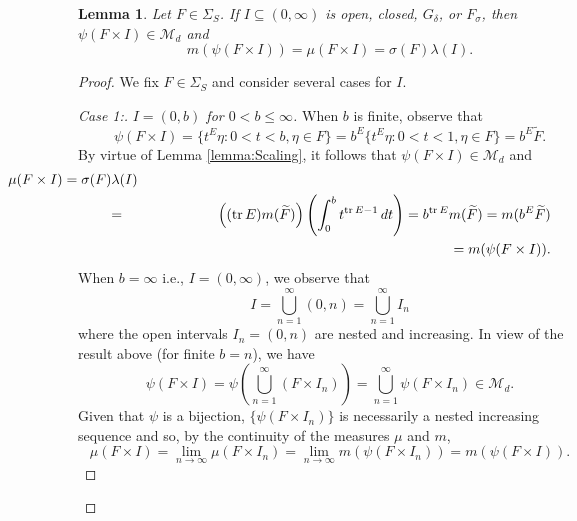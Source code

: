 \documentclass[11pt]{article}
\theoremstyle{theorem}
\newtheorem{lemma}[theorem]{Lemma}
\newcommand*{\myproofname}{Proof}
\newenvironment{subproof}[1][\myproofname]{\begin{proof}[#1]\renewcommand*{\qedsymbol}{$\mathbin{/\mkern-6mu/}$}}{\end{proof}}
\newcommand\tr{\operatorname{tr}}
\begin{document}
\begin{lemma}\label{lem:SpecialRectangle}
Let $F\in\Sigma_S$. If $I\subseteq (0,\infty)$ is open, closed, $G_\delta$, or $F_\sigma$, then $\psi(F\times I)\in\mathcal{M}_d$ and
\begin{equation}\label{eq:SpecialRectangle}
m(\psi(F\times I))=\mu(F\times I)=\sigma(F)\lambda(I).
\end{equation}
\end{lemma}
\begin{proof}
We fix $F\in\Sigma_S$ and consider several cases for $I$.\\

\begin{subproof}[Case 1:]\textit{$I=(0,b)$ for $0<b\leq \infty$.} When $b$ is finite, observe that
\begin{equation*}
\psi(F\times I)=\{t^E\eta:0<t<b,\eta\in F\}=b^E\{t^E\eta:0<t<1,\eta \in F\}=b^E\widetilde{F}.
\end{equation*}
By virtue of Lemma \ref{lemma:Scaling}, it follows that $\psi(F\times I)\in\mathcal{M}_d$ and
\begin{eqnarray*}
\lefteqn{\hspace{-2.5cm}\mu(F\times I)=\sigma(F)\lambda(I)}\\
&=&\left((\tr E) m(\widetilde{F})\right)\left(\int_0^b t^{\tr E-1}\,dt\right)=b^{\tr E}m(\widetilde{F})=m(b^{E}\widetilde{F})\\
&&\hspace{8cm}=m(\psi(F\times I)).
\end{eqnarray*}
When $b=\infty$ i.e., $I=(0,\infty)$, we observe that
\begin{equation*}
I=\bigcup_{n=1}^\infty (0,n)=\bigcup_{n=1}^\infty I_n
\end{equation*}
where the open intervals $I_n=(0,n)$ are nested and increasing. In view of the result above (for finite $b=n$), we have
\begin{equation*}\psi(F\times I)=\psi\left(\bigcup_{n=1}^\infty (F\times I_n)\right)=\bigcup_{n=1}^\infty\psi(F\times I_n)\in\mathcal{M}_d.
\end{equation*}
Given that $\psi$ is a bijection, $\{\psi(F\times I_n)\}$ is necessarily a nested increasing sequence and so, by the continuity of the measures $\mu$ and $m$,
\begin{equation*}
\mu(F\times I)=\lim_{n\to\infty}\mu(F\times I_n)=\lim_{n\to\infty}m(\psi(F\times I_n))= m(\psi(F\times I)). 
\end{equation*}
\end{subproof}


\end{proof}
\end{document}

